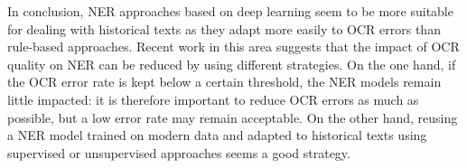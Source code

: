 In conclusion, NER approaches based on deep learning seem to be more suitable for dealing with historical texts as they adapt more easily to OCR errors than rule-based approaches.
Recent work in this area suggests that the impact of OCR quality on NER can be reduced by using different strategies.
On the one hand, if the OCR error rate is kept below a certain threshold, the NER models remain little impacted: it is therefore important to reduce OCR errors as much as possible, but a low error rate may remain acceptable.
On the other hand, reusing a NER model trained on modern data and adapted to historical texts using supervised or unsupervised approaches seems a good strategy. 





